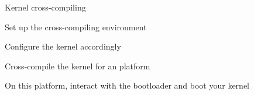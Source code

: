 \setuplabframe
{Kernel cross-compiling}
{
  \startitemize
  \item Set up the cross-compiling environment
  \item Configure the kernel  accordingly
  \item Cross-compile the kernel for an  platform
  \item On this platform, interact with the bootloader and boot your
    kernel
  \stopitemize
}
